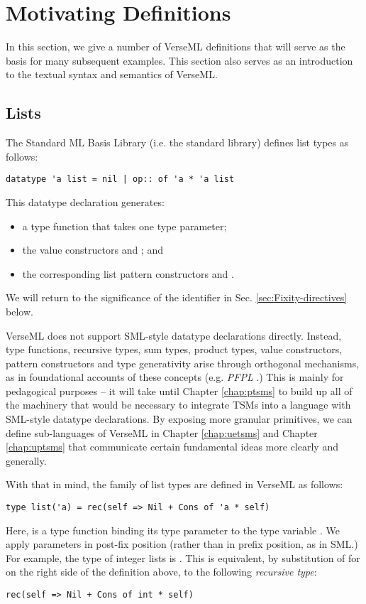 \section{Motivating Definitions}\label{sec:motivating-examples}
In this section, we give a number of VerseML definitions that will serve as the basis for many subsequent examples. This section also serves as an introduction to the textual syntax and semantics of VerseML.

\subsection{Lists}\label{sec:lists}
The Standard ML Basis Library (i.e.  the standard library) defines list types as follows:
\begin{lstlisting}[numbers=none]
datatype 'a list = nil | op:: of 'a * 'a list
\end{lstlisting}
This datatype declaration generates:
\begin{itemize}
\item a type function  that takes one type parameter; 
\item the value constructors  and ; and
\item the corresponding list pattern constructors  and .
\end{itemize}
We will return to the significance of the identifier  in Sec. \ref{sec:Fixity-directives} below.

VerseML does not support SML-style datatype declarations directly. Instead, type functions, recursive types, sum types, product types, value constructors, pattern constructors and type generativity arise through orthogonal mechanisms, as in foundational accounts of these concepts (e.g. \emph{PFPL} \cite{pfpl}.) This is mainly for pedagogical purposes -- it will take until Chapter \ref{chap:ptsms} to build up all of the machinery that would be necessary to integrate TSMs into a language with SML-style datatype declarations. By exposing more granular primitives, we can define sub-languages of VerseML in Chapter \ref{chap:uetsms} and Chapter \ref{chap:uptsms} that communicate certain fundamental ideas more clearly and generally.

With that in mind, the family of list types are defined in VerseML as follows:
\begin{lstlisting}[numbers=none]
type list('a) = rec(self => Nil + Cons of 'a * self)
\end{lstlisting}
Here,  is a {type function} binding its type parameter to the type variable . We apply parameters in post-fix position (rather than in prefix position, as in SML.) For example, the type of integer lists is . This is equivalent, by substitution of  for  on the right side of the definition above, to the following \emph{recursive type}:
\begin{lstlisting}[numbers=none]
rec(self => Nil + Cons of int * self)
\end{lstlisting}

